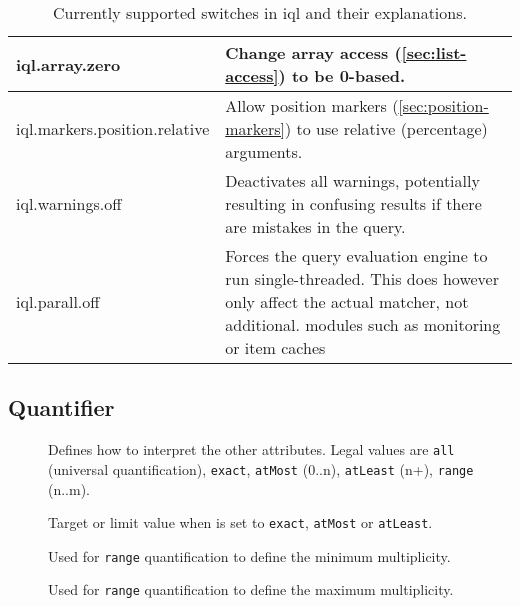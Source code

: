 \documentclass[11pt,a4paper]{article}
\begin{document}
\begin{table}[!htb]
\begin{tabular}{|p{}|p{}|}
\hline
iql.array.zero              & Change array access (\ref{sec:list-access}) to be 0-based.  \\ 
\hline
iql.markers.position.relative & Allow position markers (\ref{sec:position-markers}) to use relative (percentage) arguments.  \\ 
\hline
iql.warnings.off            & Deactivates all warnings, potentially resulting in confusing results if there are mistakes in the query.  \\ 
\hline
iql.parall.off			  & Forces the query evaluation engine to run single-threaded. This does however only affect the actual matcher, not additional. modules such as monitoring or item caches  \\ 
\hline
\end{tabular}
\caption[Supported query switches]{Currently supported switches in \ac{iql} and their explanations.}
\label{tab:switches}
\end{table}

\subsection{Quantifier}
\label{sec:json-ld-quantifier}
\begin{attributes}{}
\end{attributes}
\begin{description}
	\item[] Defines how to interpret the other attributes. Legal values are \texttt{all} (universal quantification), \texttt{exact}, \texttt{atMost} (0..n), \texttt{atLeast} (n+), \texttt{range} (n..m).
	\item[] Target or limit value when  is set to \texttt{exact}, \texttt{atMost} or \texttt{atLeast}.
	\item[] Used for \texttt{range} quantification to define the minimum multiplicity.
	\item[] Used for \texttt{range} quantification to define the maximum multiplicity.
\end{description}
\end{document}
